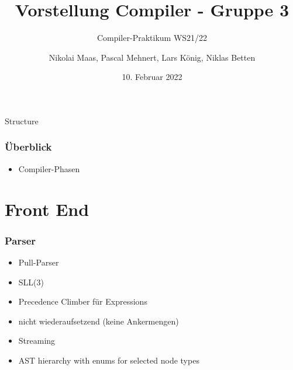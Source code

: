 \documentclass[navbaroff,en]{sdqbeamer}
\title{Vorstellung Compiler - Gruppe 3}
\subtitle{Compiler-Praktikum WS21/22}
\author[Nikolai, Pascal, Lars, Niklas]{Nikolai Maas, Pascal Mehnert, Lars König, Niklas Betten}
\date[10.\,2.\,2022]{10. Februar 2022}
\begin{document}
\KITtitleframe

\begin{frame}{Structure}
\tableofcontents
\end{frame}

\begin{frame}
    \frametitle{Überblick}

    \begin{itemize}
        \item Compiler-Phasen
    \end{itemize}

\end{frame}


\section{Front End}

\begin{frame}
	\frametitle{Parser}

    \begin{itemize}
        \item Pull-Parser
        \item SLL(3)
        \item Precedence Climber für Expressions
        \item nicht wiederaufsetzend (keine Ankermengen)
        \item Streaming
        \item AST hierarchy with enums for selected node types
    \end{itemize}

\end{frame}
\end{document}
